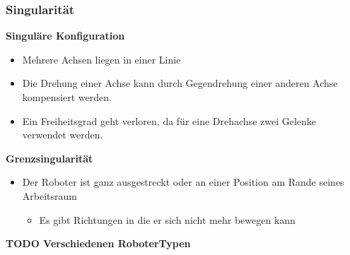 \subsubsection{Singularität}
\begin{minipage}{0.5\linewidth}
\textbf{Singuläre Konfiguration}
\begin{itemize}
	\item Mehrere Achsen liegen in einer Linie
	\item Die Drehung einer Achse kann durch Gegendrehung einer anderen Achse kompensiert werden.
	\item Ein Freiheitsgrad geht verloren, da für eine Drehachse zwei Gelenke verwendet werden.
\end{itemize}
\end{minipage}
\begin{minipage}{0.5\linewidth}
	\textbf{Grenzsingularität}\newline
	\begin{itemize}
		\item Der Roboter ist ganz ausgestreckt oder an einer Position am Rande seines Arbeitsraum
		\begin{itemize}
			\item Es gibt Richtungen in die er sich nicht mehr bewegen kann
		\end{itemize}
	\end{itemize}
\end{minipage}

\textbf{TODO Verschiedenen RoboterTypen}